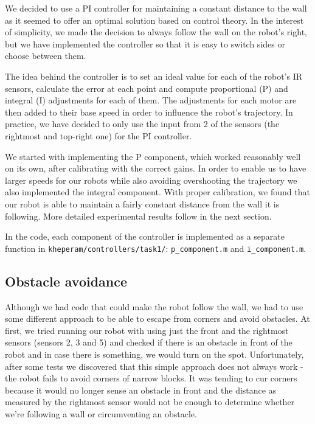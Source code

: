 \documentclass[10pt,a4paper]{article}
\begin{document}
We decided to use a PI controller for maintaining a constant distance to
the wall as it seemed to offer an optimal solution based on control
theory. In the interest of simplicity, we made the decision to always
follow the wall on the robot's right, but we have implemented the
controller so that it is easy to switch sides or choose between them.

The idea behind the controller is to set an ideal value for each of the
robot's IR sensors, calculate the error at each point and compute
proportional (P) and integral (I) adjustments for each of them. The
adjustments for each motor are then added to their base speed in order
to influence the robot's trajectory. In practice, we have decided to
only use the input from 2 of the sensors (the rightmost and top-right
one) for the PI controller.

We started with implementing the P component, which worked reasonably
well on its own, after calibrating with the correct gains. In order to
enable us to have larger speeds for our robots while also avoiding
overshooting the trajectory we also implemented the integral component.
With proper calibration, we found that our robot is able to maintain a
fairly constant distance from the wall it is following. More detailed
experimental results follow in the next section.

In the code, each component of the controller is implemented as a
separate function in \texttt{kheperam/controllers/task1/}:
\texttt{p\_component.m} and \texttt{i\_component.m}.

\subsection{Obstacle avoidance}\label{obstacle-avoidance}

Although we had code that could make the robot follow the wall, we had
to use some different approach to be able to escape from corners and
avoid obstacles. At first, we tried running our robot with using just
the front and the rightmost sensors (sensors 2, 3 and 5) and checked if
there is an obstacle in front of the robot and in case there is
something, we would turn on the spot. Unfortunately, after some tests we
discovered that this simple approach does not always work - the robot
fails to avoid corners of narrow blocks. It was tending to cur corners
because it would no longer sense an obstacle in front and the distance
as measured by the rightmost sensor would not be enough to determine
whether we're following a wall or circumventing an obstacle.
\end{document}
